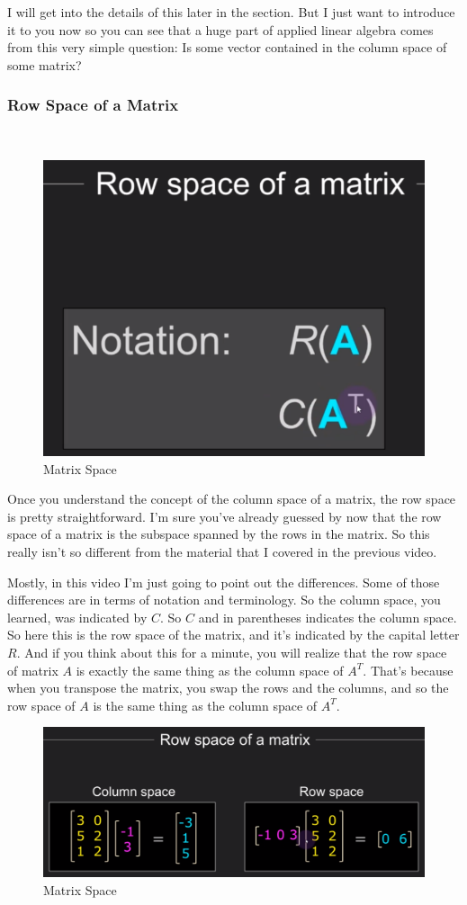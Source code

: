 \documentclass[fleqn,10pt]{olplainarticle}
\theoremstyle{definition}
\theoremstyle{remark}
\begin{document}
I will get into the details of this later in the section. But I just want to introduce it to you now so you can see that a huge part of applied linear algebra comes from this very simple question: Is some vector contained in the column space of some matrix?

\pagebreak

\subsubsection*{Row Space of a Matrix}\

\begin{figure}[ht]
	\centering
	\includegraphics[width=0.2\linewidth]{images/matrix-space-13.png}
	\caption{Matrix Space}
	\label{fig:matrix_space_13}
\end{figure}

Once you understand the concept of the column space of a matrix, the row space is pretty straightforward. I'm sure you've already guessed by now that the row space of a matrix is the subspace spanned by the rows in the matrix. So this really isn't so different from the material that I covered in the previous video. 

Mostly, in this video I'm just going to point out the differences. Some of those differences are in terms of notation and terminology. So the column space, you learned, was indicated by $C$. So $C$ and in parentheses indicates the column space. So here this is the row space of the matrix, and it's indicated by the capital letter $R$. And if you think about this for a minute, you will realize that the row space of matrix $A$ is exactly the same thing as the column space of $A^T$. That's because when you transpose the matrix, you swap the rows and the columns, and so the row space of $A$ is the same thing as the column space of $A^T$.

\begin{figure}[ht]
	\centering
	\includegraphics[width=0.5\linewidth]{images/matrix-space-14.png}
	\caption{Matrix Space}
	\label{fig:matrix_space_14}
\end{figure}
\end{document}
